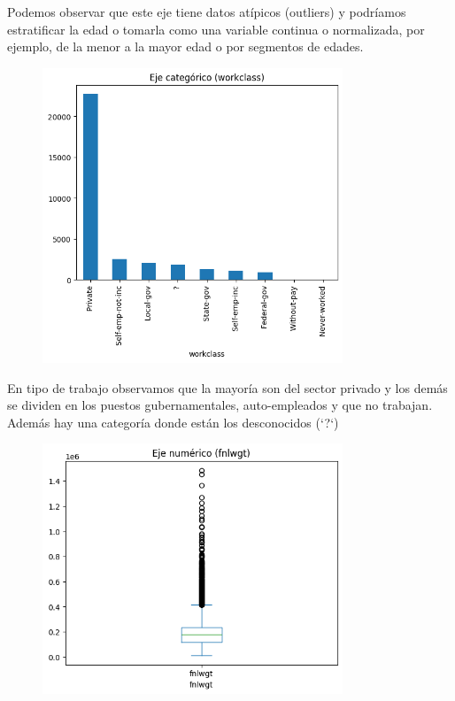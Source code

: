 \documentclass{article}
\begin{document}
	Podemos observar que este eje tiene datos atípicos (outliers) y podríamos estratificar la edad o tomarla como una variable continua o normalizada, por ejemplo, de la menor a la mayor edad o por segmentos de edades.
	\begin{figure}[H]
		\centering
		\includegraphics[width=0.8\textwidth]{workclass.png}  
	\end{figure}
	En tipo de trabajo observamos que la mayoría son del sector privado y los demás se dividen en los puestos gubernamentales, auto-empleados y que no trabajan. Además hay una categoría donde están los desconocidos (`?`)
	\begin{figure}[H]
		\centering
		\includegraphics[width=0.8\textwidth]{fnlwgt.png}  
	\end{figure}
\end{document}
